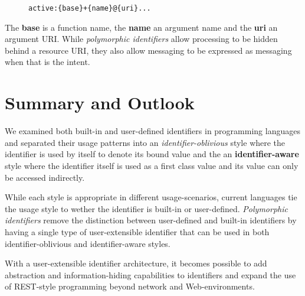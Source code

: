\documentclass[preprint,authoryear]{acm_proc_article-sp}
\begin{document}

\begin{figure}[htbp]
\begin{lstlisting}[style=L,label= activeuri,caption=Active URI.]
  active:{base}+{name}@{uri}...
\end{lstlisting}
\end{figure}

The {\bf base} is a function name, the {\bf name} an argument name and the
{\bf uri} an argument URI.
 While \emph{polymorphic identifiers} allow processing to be
hidden behind a resource URI, they also allow messaging to be expressed
as messaging when that is the intent.


\section{Summary and Outlook}
\label{summary-and-outlook}

We examined both built-in and user-defined identifiers in programming languages 
and separated their usage patterns into an {\em identifier-oblivious} style where
the identifier is used by itself to denote its bound value and the 
an {\bf identifier-aware} style where the identifier itself is used as a first class value
and its value can only be accessed indirectly.

While each style is appropriate in different usage-scenarios, current languages 
tie the usage style to wether the identifier is built-in or user-defined.  \emph{Polymorphic
identifiers} remove the distinction between user-defined and built-in identifiers by having
a single type of user-extensible identifier that can be used in both identifier-oblivious
and identifier-aware styles.

With a user-extensible identifier architecture, it becomes possible to add abstraction
and information-hiding capabilities to identifiers and expand the use of REST-style
programming beyond network and Web-environments.
\end{document}
